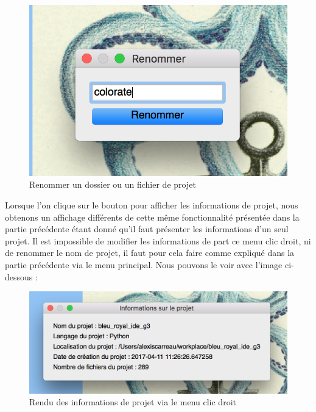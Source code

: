 \documentclass[a4paper,12pt]{article}
\begin{document}
\begin{figure}[h!]
			\begin{center}
				\includegraphics[scale=0.5]{images/rename.png}
				\caption{Renommer un dossier ou un fichier de projet}
			\end{center}
		\end{figure}
		
Lorsque l'on clique sur le bouton pour afficher les informations de projet, nous obtenons un affichage différents de cette même fonctionnalité présentée dans la partie précédente étant donné qu'il faut présenter les informations d'un seul projet. Il est impossible de modifier les informations de part ce menu clic droit, ni de renommer le nom de projet, il faut pour cela faire comme expliqué dans la partie précédente via le menu principal. Nous pouvons le voir avec l'image ci-dessous :

 \begin{figure}[h!]
			\begin{center}
				\includegraphics[scale=0.5]{images/info_project4.png}
				\caption{Rendu des informations de projet via le menu clic droit}
			\end{center}
		\end{figure}
\end{document}
